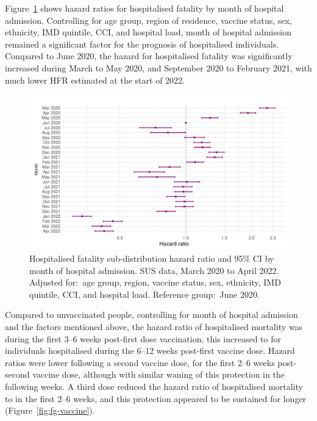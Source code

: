 Figure~\ref{fig:fg-month} shows hazard ratios for hospitalised fatality by month of hospital admission. Controlling for age group, region of residence, vaccine status, sex, ethnicity, IMD quintile, CCI, and hospital load, month of hospital admission remained a significant factor for the prognosis of hospitalised individuals. Compared to June 2020, the hazard for hospitalised fatality was significantly increased during March to May 2020, and September 2020 to February 2021, with much lower HFR estimated at the start of 2022.

\begin{figure}[htbp!]
    \centering
    \includegraphics[width=\textwidth]{fg_month.pdf}
    \caption[Hospitalised fatality sub-distribution hazard ratio by month of hospital admission in SUS data, March 2020 to April 2022]{Hospitalised fatality sub-distribution hazard ratio and 95\% CI by month of hospital admission. SUS data, March 2020 to April 2022. Adjusted for:\ age group, region, vaccine status, sex, ethnicity, IMD quintile, CCI, and hospital load. Reference group:\ June 2020.}\label{fig:fg-month}
\end{figure}

Compared to unvaccinated people, controlling for month of hospital admission and the factors mentioned above, the hazard ratio of hospitalised mortality was  during the first 3--6 weeks post-first dose vaccination, this increased to  for individuals hospitalised during the 6--12 weeks post-first vaccine dose. Hazard ratios were lower following a second vaccine dose,  for the first 2--6 weeks post-second vaccine dose, although with similar waning of this protection in the following weeks. A third dose reduced the hazard ratio of hospitalised mortality to  in the first 2--6 weeks, and this protection appeared to be sustained for longer (Figure~\ref{fig:fg-vaccine}).


